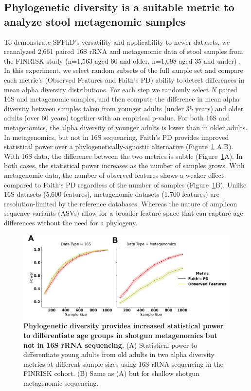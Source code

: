 \subsection{Phylogenetic diversity is a suitable metric to analyze stool metagenomic samples}

To demonstrate SFPhD’s versatility and applicability to newer datasets, we reanalyzed 2,661 paired 16S rRNA and metagenomic data of stool samples from the FINRISK \cite{Borodulin2015-uz,Salosensaari2020-tx,Borodulin2017-sx} study (n=1,563 aged 60 and older, n=1,098 aged 35 and under) \cite{Salosensaari2020-tx,Borodulin2015-uz}. In this experiment, we select random subsets of the full sample set and compare each metric’s (Observed Features and Faith’s PD) ability to detect differences in mean alpha diversity distributions. For each step we randomly select $N$ paired 16S and metagenomic samples, and then compute the difference in mean alpha diversity between samples taken from younger adults (under 35 years) and older adults (over 60 years) together with an empirical p-value. For both 16S and metagenomics, the alpha diversity of younger adults is lower than in older adults. In metagenomics, but not in 16S sequencing, Faith’s PD provides improved statistical power over a phylogenetically-agnostic alternative (Figure~\ref{faiths_pd_fig3} A,B). With 16S data, the difference between the two metrics is subtle (Figure~\ref{faiths_pd_fig3}A). In both cases, the statistical power increases as the number of samples grows. With metagenomic data, the number of observed features shows a weaker effect compared to Faith’s PD regardless of the number of samples (Figure~\ref{faiths_pd_fig3}B). Unlike 16S datasets (5,600 features), metagenomic datasets (1,700 features) are resolution-limited by the reference databases. Whereas the nature of amplicon sequence variants (ASVs) allow for a broader feature space that can capture age-differences without the need for a phylogeny. 

\begin{figure}[htbp]
\centering
\includegraphics[width=\textwidth]{faiths-pd-figures/figure03.png}
\caption[Phylogenetic diversity provides increased statistical power to differentiate age groups in shotgun metagenomics but not in 16S rRNA sequencing.]{\textbf{Phylogenetic diversity provides increased statistical power to differentiate age groups in shotgun metagenomics but not in 16S rRNA sequencing.}  (A) Statistical power to differentiate young adults from old adults in two alpha diversity metrics at different sample sizes using 16S rRNA sequencing in the FINRISK cohort. (B) Same as (A) but for shallow shotgun metagenomic sequencing.}
\label{faiths_pd_fig3}
\end{figure}

